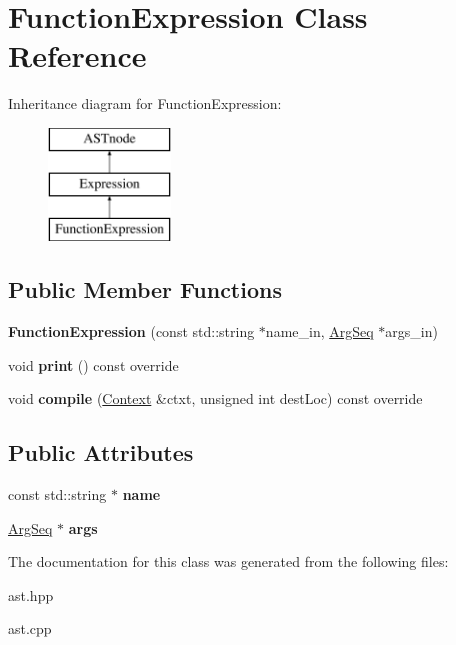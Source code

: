 \hypertarget{class_function_expression}{}\section{Function\+Expression Class Reference}
\label{class_function_expression}
Inheritance diagram for Function\+Expression\+:\begin{figure}[H]
\begin{center}
\leavevmode
\includegraphics[height=3.000000cm]{class_function_expression}
\end{center}
\end{figure}
\subsection*{Public Member Functions}
\begin{DoxyCompactItemize}
\item 
\mbox{\label{class_function_expression_a94946fa67e5e4183faf46eadcb1b2eef}} 
{\bfseries Function\+Expression} (const std\+::string $\ast$name\+\_\+in, \hyperlink{class_arg_seq}{Arg\+Seq} $\ast$args\+\_\+in)
\item 
\mbox{\label{class_function_expression_a5027d5ca974d3aa426cffdb5408266f3}} 
void {\bfseries print} () const override
\item 
\mbox{\label{class_function_expression_a83d0abae2f3b3120339aa18a115bdf8a}} 
void {\bfseries compile} (\hyperlink{class_context}{Context} \&ctxt, unsigned int dest\+Loc) const override
\end{DoxyCompactItemize}
\subsection*{Public Attributes}
\begin{DoxyCompactItemize}
\item 
\mbox{\label{class_function_expression_a83d909ec6471c112132860f8410945aa}} 
const std\+::string $\ast$ {\bfseries name}
\item 
\mbox{\label{class_function_expression_a26950b4622b292d4594dcc1ce9d6e4bc}} 
\hyperlink{class_arg_seq}{Arg\+Seq} $\ast$ {\bfseries args}
\end{DoxyCompactItemize}


The documentation for this class was generated from the following files\+:\begin{DoxyCompactItemize}
\item 
ast.\+hpp\item 
ast.\+cpp\end{DoxyCompactItemize}
